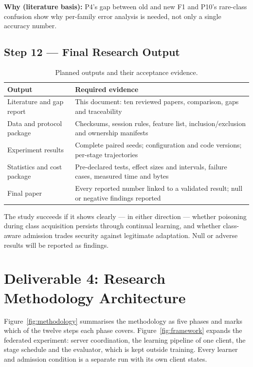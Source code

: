 \documentclass[10pt,a4paper]{article}
\newcommand{\why}[1]{\par\nopagebreak[4]\noindent\colorbox{black!5}{\parbox{\dimexpr\linewidth-2\fboxsep}{\small\textbf{Why (literature basis):} #1}}\par}
\begin{document}
\why{P4's gap between old and new F1 and P10's rare-class confusion show why per-family error analysis is needed, not only a single accuracy number.}

\subsection{Step 12 --- Final Research Output}
\begin{table}[H]
\centering\footnotesize
\caption{Planned outputs and their acceptance evidence.}
\label{tab:artifacts}
\begin{tabularx}{\linewidth}{L{3.4cm}Y}
\toprule
Output & Required evidence\\
\midrule
Literature and gap report & This document: ten reviewed papers, comparison, gaps and traceability\\
Data and protocol package & Checksums, session rules, feature list, inclusion/exclusion and ownership manifests\\
Experiment results & Complete paired seeds; configuration and code versions; per-stage trajectories\\
Statistics and cost package & Pre-declared tests, effect sizes and intervals, failure cases, measured time and bytes\\
Final paper & Every reported number linked to a validated result; null or negative findings reported\\
\bottomrule
\end{tabularx}
\end{table}
The study succeeds if it shows clearly --- in either direction --- whether poisoning during class acquisition persists through continual learning, and whether class-aware admission trades security against legitimate adaptation. Null or adverse results will be reported as findings.

\section{Deliverable 4: Research Methodology Architecture}
Figure~\ref{fig:methodology} summarises the methodology as five phases and marks which of the twelve steps each phase covers. Figure~\ref{fig:framework} expands the federated experiment: server coordination, the learning pipeline of one client, the stage schedule and the evaluator, which is kept outside training. Every learner and admission condition is a separate run with its own client states.
\end{document}
